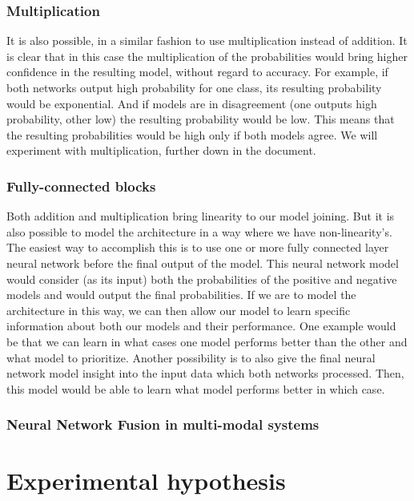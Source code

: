 \documentclass[b5paper]{book}
\begin{document}
\subsection{Multiplication}

It is also possible, in a similar fashion to use multiplication instead of addition. It is clear that in this case the multiplication of the probabilities would bring higher confidence in the resulting model, without regard to accuracy. For example, if both networks output high probability for one class, its resulting probability would be exponential. And if models are in disagreement (one outputs high probability, other low) the resulting probability would be low. This means that the resulting probabilities would be high only if both models agree. We will experiment with multiplication, further down in the document.

\subsection{Fully-connected blocks}

Both addition and multiplication bring linearity to our model joining. But it is also possible to model the architecture in a way where we have non-linearity's. The easiest way to accomplish this is to use one or more fully connected layer neural network before the final output of the model. This neural network model would consider (as its input) both the probabilities of the positive and negative models and would output the final probabilities. If we are to model the architecture in this way, we can then allow our model to learn specific information about both our models and their performance. One example would be that we can learn in what cases one model performs better than the other and what model to prioritize. Another possibility is to also give the final neural network model insight into the input data which both networks processed. Then, this model would be able to learn what model performs better in which case.

\subsection{Neural Network Fusion in multi-modal systems}


\chapter{Experimental hypothesis}
\end{document}
